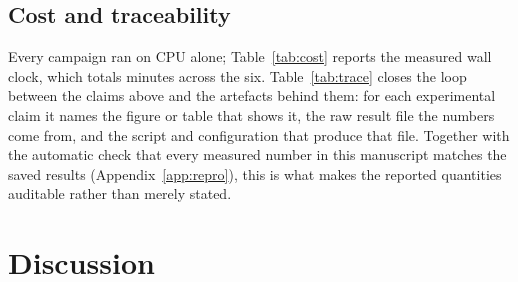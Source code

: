 \documentclass[preprint,12pt]{elsarticle}
\theoremstyle{definition}
\begin{document}
\begin{table}[t]
\centering
\caption{E6: recovery threshold and measured cost by width.}
\label{tab:e6}
\small

\end{table}

\subsection{Cost and traceability}

Every campaign ran on CPU alone; Table~\ref{tab:cost} reports the measured wall clock, which
totals \DurTotalMin{} minutes across the six. Table~\ref{tab:trace} closes the loop between the
claims above and the artefacts behind them: for each experimental claim it names the figure or
table that shows it, the raw result file the numbers come from, and the script and
configuration that produce that file. Together with the automatic check that every measured
number in this manuscript matches the saved results (Appendix~\ref{app:repro}), this is what
makes the reported quantities auditable rather than merely stated.

\begin{table}[t]
\centering
\caption{Measured computational cost, read from the run records. E1--E6 are CPU-only and hide any
accelerator that is present, so they cannot silently become irreproducible on a CPU-only machine.
E7 and E8 train on a GPU; every number this paper draws from them is then recomputed from their
saved weights on a CPU, so no claim here depends on access to an accelerator. \emph{jobs} counts
models for the GPU campaigns and configured jobs for the others. $^{\dagger}$Stage~A was resumed,
and a run record times only the final invocation, so this figure is the last leg rather than the
campaign.}
\label{tab:cost}
\small

\end{table}

\begin{table}[t]
\centering
\caption{Traceability: each experimental claim, the figure or table that shows it, the raw
result file it comes from, and the script and configuration that produce it. Reproduction
commands are in Appendix~\ref{app:repro}.}
\label{tab:trace}
\small

\end{table}

\FloatBarrier

\section{Discussion}
\label{sec:discussion}
\end{document}
